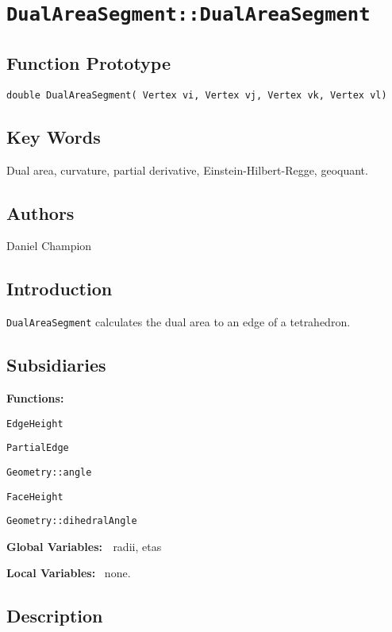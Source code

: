                       

\section*{\texttt{DualAreaSegment::DualAreaSegment}}

\subsection*{Function Prototype}

\texttt{double DualAreaSegment( Vertex vi, Vertex vj, Vertex vk, Vertex vl)}

\subsection*{Key Words}

Dual area, curvature, partial derivative, Einstein-Hilbert-Regge, geoquant.

\subsection*{Authors}

Daniel Champion

\subsection*{Introduction}

\texttt{DualAreaSegment} calculates the dual area to an edge of a
tetrahedron. \ 

\subsection*{Subsidiaries}

\textbf{Functions:}

\qquad \texttt{EdgeHeight}

\qquad \qquad \texttt{PartialEdge}

\qquad\qquad\texttt{Geometry::angle}

\qquad \texttt{FaceHeight}

\qquad\qquad\texttt{Geometry::dihedralAngle}

\textbf{Global Variables: \ }radii, etas

\textbf{Local Variables:} \ none.

\subsection*{Description}

